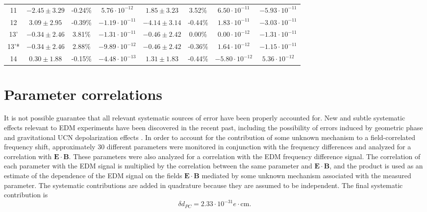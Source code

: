 \documentclass [10pt, twoside] {uwthesis}[2012/04/02]
\begin{document}
\begin{table}[t]
\begin{center}
\begin{tabular}{c|ccc|ccc|c}
11   & $-2.45 \pm 3.29 $ & -0.24\% & $ 5.76 \cdot 10^{-12}$ & $ 1.85 \pm 3.23$  &  3.52\% & $ 6.50 \cdot 10^{-11}$ & $ -5.93 \cdot 10^{-11}$\\
12   & $ 3.09 \pm 2.95 $ & -0.39\% & $-1.19 \cdot 10^{-11}$ & $-4.14 \pm 3.14$  & -0.44\% & $ 1.83 \cdot 10^{-11}$ & $ -3.03 \cdot 10^{-11}$\\
13'  & $-0.34 \pm 2.46 $ &  3.81\% & $-1.31 \cdot 10^{-11}$ & $-0.46 \pm 2.42$  &  0.00\% & $ 0.00 \cdot 10^{-12}$ & $ -1.31 \cdot 10^{-11}$\\
13'* & $-0.34 \pm 2.46 $ &  2.88\% & $-9.89 \cdot 10^{-12}$ & $-0.46 \pm 2.42$  & -0.36\% & $ 1.64 \cdot 10^{-12}$ & $ -1.15 \cdot 10^{-11}$\\
14   & $ 0.30 \pm 1.88 $ & -0.15\% & $-4.48 \cdot 10^{-13}$ & $ 1.31 \pm 1.83$  & -0.44\% & $-5.80 \cdot 10^{-12}$ & $  5.36 \cdot 10^{-12}$\\
\hline
\end{tabular}			
\end{center}										
\label{|E|_systematic}
\end{table}

\section{Parameter correlations} \label{ParameterCorr}
It is not possible guarantee that all relevant systematic sources of error have been properly accounted for. New and subtle systematic effects relevant to EDM experiments have been discovered in the recent past, including the possibility of errors induced by geometric phase \cite{2004_Geometric_Phase_ILL_nEDM} and gravitational UCN depolarization effects \cite{2015_ILL_nEDM_gravity_correction}. In order to account for the contribution of some unknown mechanism to a field-correlated frequency shift, approximately 30 different parameters were monitored in conjunction with the frequency differences and analyzed for a correlation with $\mathbf{E}\cdot\mathbf{B}$. These parameters were also analyzed for a correlation with the EDM frequency difference signal. The correlation of each parameter with the EDM signal is multiplied by the correlation between the same parameter and $\mathbf{E}\cdot\mathbf{B}$, and the product is used as an estimate of the dependence of the EDM signal on the fields $\mathbf{E}\cdot\mathbf{B}$ mediated by some unknown mechanism associated with the measured parameter. The systematic contributions are added in quadrature because they are assumed to be independent. The final systematic contribution is 
\begin{equation}
\delta d_{PC} = 2.33 \cdot 10^{-31} e\cdot \text{cm}.
\end{equation}
\end{document}
